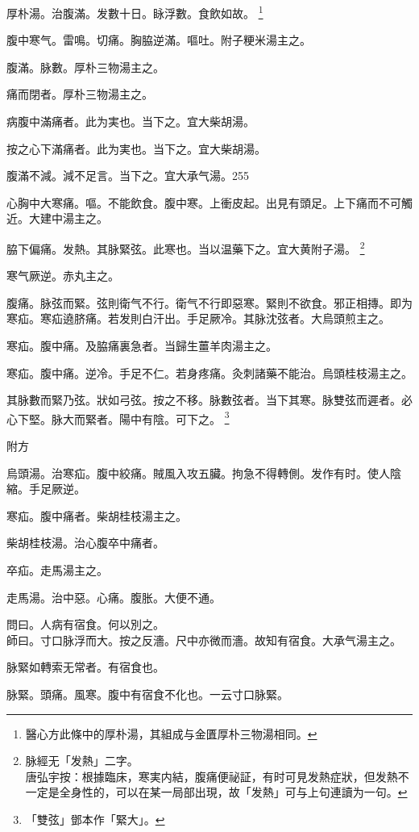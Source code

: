 厚朴湯。治腹滿。发數十日。眿浮數。食飲如故。{\yixin}
	\footnote{醫心方此條中的厚朴湯，其組成与金匱厚朴三物湯相同。}

腹中寒气。雷鳴。切痛。胸脇逆滿。嘔吐。附子粳米湯主之。

腹滿。脉數。厚朴三物湯主之。{\wuben}

痛而閉者。厚朴三物湯主之。{\dengben}

病腹中滿痛者。此为実也。当下之。宜大柴胡湯。{\wuben}

按之心下滿痛者。此为実也。当下之。宜大柴胡湯。{\dengben}

腹滿不減。減不足言。当下之。宜{\khaaitp 大}承气湯。255

心胸中大寒痛。嘔。不能飲食。腹中寒。上衝皮起。出見有頭足。上下痛而不可觸近。大建中湯主之。

脇下偏痛。{\khaaitp 发熱。}其脉緊弦。此寒也。{\khaaitp 当}以温藥下之。宜大黄附子湯。
	\footnote{脉經无「发熱」二字。\\唐弘宇按：根據臨床，寒実内結，腹痛便祕証，有时可見发熱症狀，但发熱不一定是全身性的，可以在某一局部出現，故「发熱」可与上句連讀为一句。}

寒气厥逆。赤丸主之。

腹痛。脉弦而緊。弦則衛气不行。{\khaaitp 衛气不行}即惡寒。緊則不欲食。邪正相摶。即为寒疝。寒疝遶脐痛。若发則白汗出。手足厥冷。其脉沈弦者。大烏頭煎主之。

寒疝。腹中痛。及脇痛裏急者。当歸生薑羊肉湯主之。

寒疝。腹中痛。逆冷。手足不仁。若身疼痛。灸刺諸藥不能治。烏頭桂枝湯主之。

其脉數而緊乃弦。狀如弓弦。按之不移。脉數弦者。当下其寒。脉雙弦而遲者。必心下堅。脉大而緊者。陽中有陰。可下之。
	\footnote{「雙弦」鄧本作「緊大」。}

附方

烏頭湯。治寒疝。腹中絞痛。賊風入攻五臟。拘急不得轉側。发作有时。使人陰縮。手足厥逆。

寒疝。腹中痛者。柴胡桂枝湯主之。{\wuben}

柴胡桂枝湯。治心腹卒中痛者。{\dengben}

卒疝。走馬湯主之。{\wuben}

走馬湯。治中惡。心痛。腹胀。大便不通。{\dengben}

問曰。人病有宿食。何以別之。\\
師曰。寸口脉浮而大。按之反濇。尺中亦微而濇。故知有宿食。大承气湯主之。

脉緊如轉索无常者。有宿食也。

脉緊。頭痛。風寒。腹中有宿食不化也。{\scriptsize 一云寸口脉緊。}

